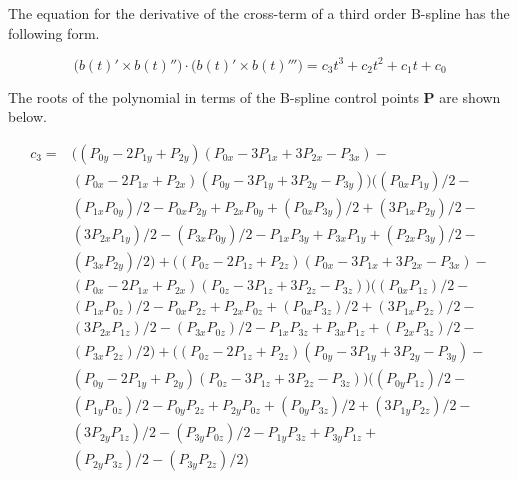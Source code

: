 \documentclass{article}
\begin{document}
The equation for the derivative of the cross-term of a third order B-spline has the following form.

\begin{equation}
    \big(b(t)' \times b(t)''\big) \cdot \big(b(t)' \times b(t)'''\big) = c_3 t^3 + c_2 t^2 + c_1 t + c_0
\end{equation}

The roots of the polynomial in terms of the B-spline control points \textbf{P} are shown below.

\begin{equation}
\begin{aligned}
c_3 =& \big((P_{0y} - 2P_{1y} + P_{2y})(P_{0x} - 3P_{1x} + 3P_{2x} - P_{3x}) - \\ & (P_{0x} - 2P_{1x} + P_{2x})(P_{0y} - 3P_{1y} + 3P_{2y} - P_{3y})\big)\big((P_{0x} P_{1y})/2 - \\
&(P_{1x}P_{0y})/2 - P_{0x}P_{2y} + P_{2x}P_{0y} + (P_{0x}P_{3y})/2 + (3P_{1x}P_{2y})/2 - \\ 
&(3P_{2x}P_{1y})/2 - (P_{3x}P_{0y})/2 - P_{1x}P_{3y} + P_{3x}P_{1y} + (P_{2x}P_{3y})/2 - \\
    &(P_{3x}P_{2y})/2\big) + \big((P_{0z} - 2P_{1z} + P_{2z})(P_{0x} - 3P_{1x} + 3P_{2x} - P_{3x}) - \\
    &(P_{0x} - 2P_{1x} + P_{2x})(P_{0z} - 3P_{1z} + 3P_{2z} - P_{3z})\big)\big((P_{0x}P_{1z})/2 - \\ & (P_{1x}P_{0z})/2 - P_{0x}P_{2z} + P_{2x}P_{0z} + (P_{0x}P_{3z})/2 + (3P_{1x}P_{2z})/2 - \\
    &(3P_{2x}P_{1z})/2 - (P_{3x}P_{0z})/2 - P_{1x}P_{3z} + P_{3x}P_{1z} + (P_{2x}P_{3z})/2 - \\
    &(P_{3x}P_{2z})/2\big) + \big((P_{0z} - 2P_{1z} + P_{2z})(P_{0y} - 3P_{1y} + 3P_{2y} - P_{3y}) - \\
    &(P_{0y} - 2P_{1y} + P_{2y})(P_{0z} - 3P_{1z} + 3P_{2z} - P_{3z})\big)\big((P_{0y}P_{1z})/2 - \\
    &(P_{1y}P_{0z})/2 - P_{0y}P_{2z} + P_{2y}P_{0z} + (P_{0y}P_{3z})/2 + (3P_{1y}P_{2z})/2 - \\
    &(3P_{2y}P_{1z})/2 - (P_{3y}P_{0z})/2 - P_{1y}P_{3z} + P_{3y}P_{1z} + \\
    &(P_{2y}P_{3z})/2 - (P_{3y} P_{2z})/2\big)
\end{aligned}
\end{equation}
\end{document}
